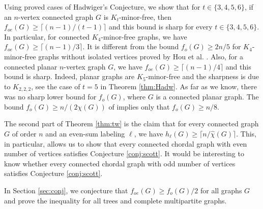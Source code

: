 \documentclass{article}
\newcommand{\Ftwo}{\mathbb{F}_2}
\newcommand{\mchi}{\hat{\chi}}
\newcommand{\2}{\vspace{0.2cm}}
\begin{document}
Using proved cases of Hadwiger's Conjecture, we show that for $t\in \{3,4,5,6\}$, if an $n$-vertex connected graph $G$ is $K_t$-minor-free, then $f_{oe}(G)\ge \lceil (n-1)/(t-1)\rceil$ and this bound is sharp for every
$t\in \{3,4,5,6\}$. In particular, for connected $K_4$-minor-free graphs, we have  $f_{oe}(G)\ge \lceil (n-1)/3\rceil .$ It is different from the bound
$f_o(G)\ge 2n/5$ for $K_4$-minor-free graphs without isolated vertices proved by Hou et al. \cite{HYLL}.
Also, for a connected planar $n$-vertex graph $G$, we have $f_{oe}(G)\ge \lceil (n-1)/4 \rceil$ and this bound is sharp. Indeed, planar graphs are $K_5$-minor-free and the sharpness is due to $K_{2,2,2}$, see the case of $t=5$ in Theorem \ref{thm:Hadw}. As far as we know, there was no sharp lower bound for $f_o(G)$, where $G$ is a connected planar graph. The bound $f_o(G)\ge n/(2\chi(G))$ of \cite{Scott1992} implies only that $f_o(G)\ge n/8$. 

 
The second part of Theorem \ref{thm:tw} is the claim that for every connected graph $G$ of order $n$ and an even-sum labeling $\ell$,
we have $h_{\ell}(G)\ge \lceil n/\mchi(G) \rceil$. This, in particular, allows us to show that every connected chordal graph with even number of vertices satisfies Conjecture \ref{conj:scott}.
It would be interesting to know whether every connected chordal graph with odd number of vertices satisfies Conjecture \ref{conj:scott}.


In Section \ref{sec:conj}, we conjecture that $f_{oe}(G)\ge f_o(G)/2$ for all graphs $G$ and prove the inequality for all trees and complete multipartite graphs.



\end{document}
